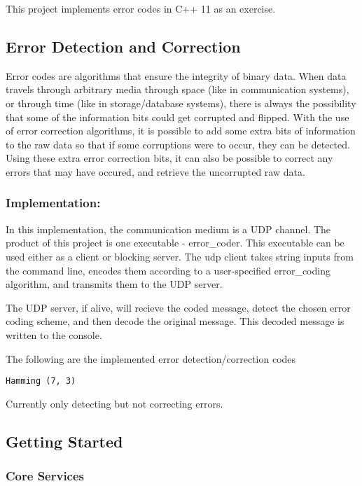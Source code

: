 This project implements error codes in C++ 11 as an exercise.

\subsection*{Error Detection and Correction}

Error codes are algorithms that ensure the integrity of binary data. When data travels through arbitrary media through space (like in communication systems), or through time (like in storage/database systems), there is always the possibility that some of the information bits could get corrupted and flipped. With the use of error correction algorithms, it is possible to add some extra bits of information to the raw data so that if some corruptions were to occur, they can be detected. Using these extra error correction bits, it can also be possible to correct any errors that may have occured, and retrieve the uncorrupted raw data.

\subsubsection*{Implementation\+:}

In this implementation, the communication medium is a U\+DP channel. The product of this project is one executable -\/ error\+\_\+coder. This executable can be used either as a client or blocking server. The udp client takes string inputs from the command line, encodes them according to a user-\/specified error\+\_\+coding algorithm, and transmits them to the U\+DP server.

The U\+DP server, if alive, will recieve the coded message, detect the chosen error coding scheme, and then decode the original message. This decoded message is written to the console.

The following are the implemented error detection/correction codes


\begin{DoxyItemize}
\item {\tt Hamming (7, 3)}

Currently only detecting but not correcting errors.
\end{DoxyItemize}

\subsection*{Getting Started}

\subsubsection*{Core Services}

